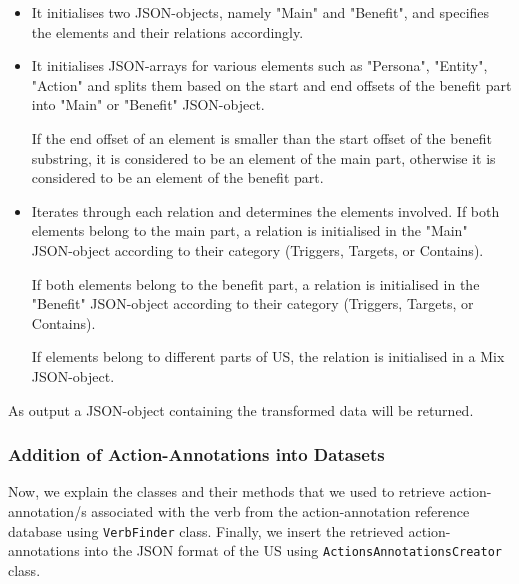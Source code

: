\begin{itemize}
\begin{itemize}
		\item It initialises two JSON-objects, namely "Main" and "Benefit", and specifies the elements and their relations accordingly.
		
		\item It initialises JSON-arrays for various elements such as "Persona", "Entity", "Action" and splits them based on the start and end offsets of the benefit part into "Main" or "Benefit" JSON-object.
		
		If the end offset of an element is smaller than the start offset of the benefit substring, it is considered to be an element of the main part, otherwise it is considered to be an element of the benefit part.
		
		\item Iterates through each relation and determines the elements involved. If both elements belong to the main part, a relation is initialised in the "Main" JSON-object according to their category (Triggers, Targets, or Contains). 
		
		If both elements belong to the benefit part, a relation is initialised in the "Benefit" JSON-object according to their category (Triggers, Targets, or Contains). 
		
		If elements belong to different parts of US, the relation is initialised in a Mix JSON-object.
		
	\end{itemize}
	As output a JSON-object containing the transformed data will be returned.
\end{itemize}
\subsubsection*{Addition of Action-Annotations into Datasets}\label{conflict_action_annotation}
Now, we explain the classes and their methods that we used to retrieve action-annotation/s associated with the verb from the action-annotation reference database using \texttt{VerbFinder} class. Finally, we insert the retrieved action-annotations into the JSON format of the US using \texttt{ActionsAnnotationsCreator} class.
